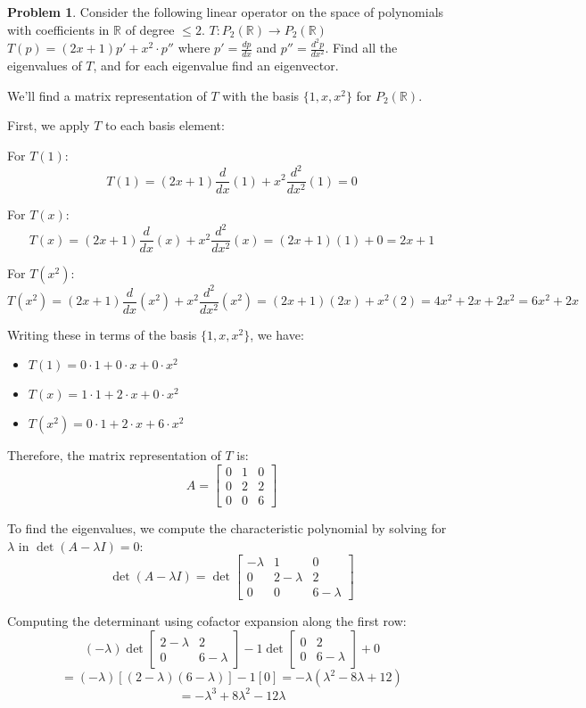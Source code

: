 \documentclass[12pt, oneside]{amsart}
\theoremstyle{definition}
\newtheorem{prob}{Problem}
\begin{document}
\begin{prob}
    Consider the following linear operator on the space of polynomials with coefficients in $\mathbb R$ of degree $\leq 2$.
    $T:P_2(\mathbb R) \to P_2(\mathbb R)$
    $T(p) = (2x+1)p' + x^2\cdot p''$
    where $p' = \frac{dp}{dx}$ and $p'' = \frac{d^2p}{dx^2}$. Find all the eigenvalues of $T$, and for each eigenvalue find an eigenvector.
    
    \begin{solution}
    
    We'll find a matrix representation of $T$ with the basis $\{1, x, x^2\}$ for $P_2(\mathbb{R})$.

First, we apply $T$ to each basis element:

For $T(1)$:
\[
T(1) = (2x+1) \frac{d}{dx}(1) + x^2 \frac{d^2}{dx^2}(1) = 0
\]

For $T(x)$:
\[
T(x) = (2x+1) \frac{d}{dx}(x) + x^2 \frac{d^2}{dx^2}(x) = (2x+1)(1) + 0 = 2x + 1
\]

For $T(x^2)$:
\[
T(x^2) = (2x+1) \frac{d}{dx}(x^2) + x^2 \frac{d^2}{dx^2}(x^2) = (2x+1)(2x) + x^2(2) = 4x^2 + 2x + 2x^2 = 6x^2 + 2x
\]

Writing these in terms of the basis $\{1, x, x^2\}$, we have:
\begin{itemize}
    \item $T(1) = 0 \cdot 1 + 0 \cdot x + 0 \cdot x^2$
    \item $T(x) = 1 \cdot 1 + 2 \cdot x + 0 \cdot x^2$
    \item $T(x^2) = 0 \cdot 1 + 2 \cdot x + 6 \cdot x^2$
\end{itemize}

Therefore, the matrix representation of $T$ is:
\[
A = \begin{bmatrix} 0 & 1 & 0 \\ 0 & 2 & 2 \\ 0 & 0 & 6 \end{bmatrix}
\]

To find the eigenvalues, we compute the characteristic polynomial by solving for $\lambda$ in $\det(A - \lambda I) = 0$:
\[
\det(A - \lambda I) = \det \begin{bmatrix} -\lambda & 1 & 0 \\ 0 & 2-\lambda & 2 \\ 0 & 0 & 6-\lambda \end{bmatrix}
\]

Computing the determinant using cofactor expansion along the first row:
\[
(-\lambda) \det \begin{bmatrix} 2-\lambda & 2 \\ 0 & 6-\lambda \end{bmatrix} - 1 \det \begin{bmatrix} 0 & 2 \\ 0 & 6-\lambda \end{bmatrix} + 0
\]
\[
= (-\lambda)[(2-\lambda)(6-\lambda)] - 1[0] = -\lambda(\lambda^2 - 8\lambda + 12)
\]
\[
= -\lambda^3 + 8\lambda^2 - 12\lambda
\]


\end{solution}
\end{prob}
\end{document}
